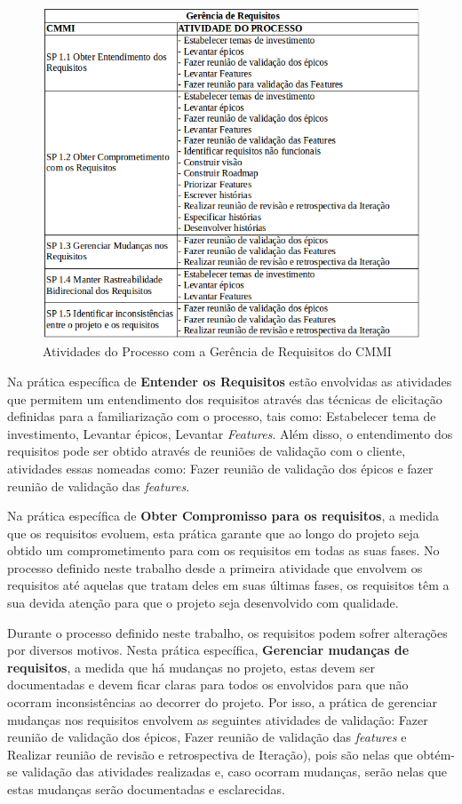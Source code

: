 \begin{figure}[!htb]
\centering
\includegraphics[scale=0.6]{figuras/gerencia.png}
\caption{Atividades do Processo com a Gerência de Requisitos do CMMI}
\label{fig:gerencia}
\end{figure}


Na prática específica de \textbf{Entender os Requisitos} estão envolvidas as atividades 
que permitem um entendimento dos requisitos através das técnicas de elicitação 
definidas para a familiarização com o processo, tais como: 
Estabelecer tema de investimento, Levantar épicos, Levantar \textit{Features}. Além disso,
o entendimento dos requisitos pode ser obtido através de reuniões de validação com o 
cliente, atividades essas nomeadas como: Fazer reunião de validação dos épicos e fazer 
reunião de validação das \textit{features}.

Na prática específica de \textbf{Obter Compromisso para os requisitos}, a medida que os 
requisitos evoluem, esta prática garante que ao longo do projeto seja obtido um 
comprometimento para com os requisitos em todas as suas fases. No processo definido 
neste trabalho desde a primeira atividade que envolvem os requisitos até aquelas que 
tratam deles em suas últimas fases, os requisitos têm a sua devida atenção para que o 
projeto seja desenvolvido com qualidade. 

Durante o processo definido neste trabalho, os requisitos podem sofrer alterações por 
diversos motivos. Nesta prática específica, \textbf{Gerenciar mudanças de requisitos}, a
medida que há mudanças no projeto, estas devem ser documentadas e devem ficar claras para
todos os envolvidos para que não ocorram inconsistências ao decorrer do projeto. 
Por isso, a prática de gerenciar mudanças nos requisitos envolvem as seguintes atividades de 
validação: Fazer reunião de validação dos épicos, Fazer reunião de validação das 
\textit{features} e Realizar reunião de revisão e retrospectiva de Iteração), 
pois são nelas que obtém-se validação das atividades realizadas e, caso ocorram 
mudanças, serão nelas que estas mudanças serão documentadas e esclarecidas. 

